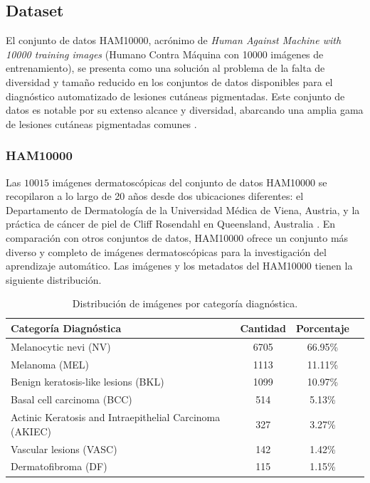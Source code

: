 \subsection{Dataset}

El conjunto de datos HAM10000, acrónimo de \textit{Human Against Machine with 10000 training images} (Humano Contra Máquina con 10000 imágenes de entrenamiento), se presenta como una solución al problema de la falta de diversidad y tamaño reducido en los conjuntos de datos disponibles para el diagnóstico automatizado de lesiones cutáneas pigmentadas. Este conjunto de datos es notable por su extenso alcance y diversidad, abarcando una amplia gama de lesiones cutáneas pigmentadas comunes . 

\subsubsection*{HAM10000}

Las $10015$ imágenes dermatoscópicas del conjunto de datos HAM10000 se recopilaron a lo largo de 20 años desde dos ubicaciones diferentes: el Departamento de Dermatología de la Universidad Médica de Viena, Austria, y la práctica de cáncer de piel de Cliff Rosendahl en Queensland, Australia . En comparación con otros conjuntos de datos, HAM10000 ofrece un conjunto más diverso y completo de imágenes dermatoscópicas para la investigación del aprendizaje automático. Las imágenes y los metadatos del HAM10000  tienen la siguiente distribución.

\begin{table}[ht]
   \centering
   \small
   \begin{tabular}{lccc}
   \hline
   \textbf{Categoría Diagnóstica} & \textbf{Cantidad} & \textbf{Porcentaje} \\
   \hline
   Melanocytic nevi (NV) & 6705 & 66.95\%  \\
   Melanoma (MEL) & 1113 & 11.11\% \\
   Benign keratosis-like lesions (BKL) & 1099 & 10.97\% \\
   Basal cell carcinoma (BCC) & 514 & 5.13\% \\
   Actinic Keratosis and Intraepithelial Carcinoma (AKIEC) & 327                         & 3.27\%              \\
   Vascular lesions (VASC) & 142 & 1.42\%  \\
   Dermatofibroma  (DF) & 115 & 1.15\% \\
   \hline
   \end{tabular}
   \caption{Distribución de imágenes por categoría diagnóstica.}
   \label{tab:ham10000_distribution}
\end{table}   
   
